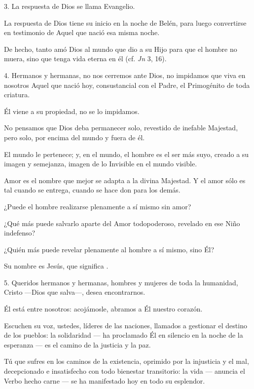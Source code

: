 \begin{body}
							3. La respuesta de Dios se llama Evangelio.
							
							La respuesta de Dios tiene su inicio en la noche de Belén, para luego convertirse en testimonio de Aquel que nació esa misma noche.
							
							De hecho, tanto amó Dios al mundo que dio a su Hijo para que el hombre no muera, sino que tenga vida eterna en él (cf. \emph{Jn} 3, 16).
							
							4. Hermanos y hermanas, no nos cerremos ante Dios, no impidamos que viva en nosotros Aquel que nació hoy, consustancial con el Padre, el Primogénito de toda criatura.
							
							Él viene a su propiedad, no se lo impidamos.
							
							No pensamos que Dios deba permanecer solo, revestido de inefable Majestad, pero solo, por encima del mundo y fuera de él.
							
							El mundo le pertenece; y, en el mundo, el hombre es el ser más suyo, creado a su imagen y semejanza, imagen de lo Invisible en el mundo visible.
							
							Amor es el nombre que mejor se adapta a la divina Majestad. Y el amor sólo es tal cuando se entrega, cuando se hace don para los demás.
							
							¿Puede el hombre realizarse plenamente a sí mismo sin amor?
							
							¿Qué más puede salvarlo aparte del Amor todopoderoso, revelado en ese Niño indefenso?
							
							¿Quién más puede revelar plenamente al hombre a sí mismo, sino Él?
							
							Su nombre es Jesús, que significa .
							
							5. Queridos hermanos y hermanas, hombres y mujeres de toda la humanidad, Cristo ---Dios que salva---, desea encontrarnos.
							
							Él está entre nosotros: acojámosle, abramos a Él nuestro corazón.
							
							Escuchen su voz, ustedes, líderes de las naciones, llamados a gestionar el destino de los pueblos: la solidaridad --- ha proclamado Él en silencio en la noche de la esperanza --- es el camino de la justicia y la paz.
							
							Tú que sufres en los caminos de la existencia, oprimido por la injusticia y el mal, decepcionado e insatisfecho con todo bienestar transitorio: la vida --- anuncia el Verbo hecho carne --- se ha manifestado hoy en todo su esplendor.
							

\end{body}
